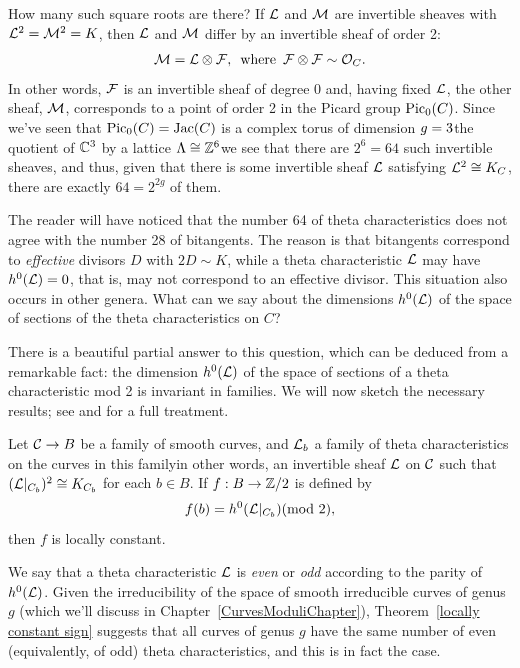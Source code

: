 How many such square roots are there? If ${\mathcal L}$ and ${\mathcal M}$ are invertible
sheaves with ${\mathcal L}^2 = {\mathcal M}^2 = K$, then ${\mathcal L}$ and ${\mathcal M}$ differ by an
invertible sheaf of order 2:
$$
{\mathcal M} = {\mathcal L} \otimes {\mathcal F}, \enspace \text{where} \enspace {\mathcal F} \otimes {\mathcal F} \sim
{\mathcal O}_C.
$$
In other words, ${\mathcal F}$ is an invertible sheaf of degree 0 and, having
fixed ${\mathcal L}$,  the other sheaf, ${\mathcal M}$, corresponds to a point of order
2 in the
Picard group
%
$\operatorname{Pic}_0(C)$. Since we've seen that $\operatorname{Pic}_0(C) =
\operatorname{Jac}(C)$ is a complex torus of dimension
$g =\nobreak 3$\emdash the quotient of ${\mathbb C}^3$
by a lattice $\Lambda \cong {\mathbb Z}^6$\emdash we see that there are $2^6 = 64$
such invertible sheaves, and thus, given that there is some invertible
sheaf ${\mathcal L}$ satisfying ${\mathcal L}^2 \cong K_C$, there are exactly $64 = 2^{2g}$
of them.

The reader will have noticed that the number 64 of theta characteristics
does not agree with the number 28 of bitangents. The reason is
that
bitangents correspond to \emph{effective} divisors $D$ with $2D
\sim K$, while a theta characteristic ${\mathcal L}$ may have $h^0({\mathcal L}) = 0$,
that is, may not correspond to an effective divisor.
This situation also occurs in other genera.
What can we say about the dimensions $h^0({\mathcal L})$ of the space of sections
of the theta characteristics on $C$?

 There is a beautiful partial answer to this question, which can be
 deduced from a remarkable fact: the dimension $h^0({\mathcal L})$ of the space
 of sections of a theta characteristic mod 2 is invariant in families.
We will now
sketch the necessary results; see \cite{MumfordPaper} and \cite{JHPaper}
for a full treatment.

 \begin{theorem}
 \label{locally constant sign}
 Let $\mathcal C \to B$ be a family of smooth curves, and ${\mathcal L}_b$ a family of
 theta characteristics on the curves in this family\emdash in other words, an
 invertible sheaf ${\mathcal L}$ on $\mathcal C$ such that $({\mathcal L}|_{C_b})^2 \cong K_{C_b}$
 for each $b \in B$.
If
$f : B \to {\mathbb Z}/2$
is defined by
 $$
 f(b) = h^0(\cL|_{C_b}) \;  \; (\mathrm{mod\ } 2),
 $$
then $f$ is locally constant.
\unif
\end{theorem}

We say that a theta characteristic ${\mathcal L}$ is \emph{even} or \emph{odd}
%
according to the parity of $h^0({\mathcal L})$. Given the irreducibility of the
space of smooth irreducible curves of genus $g$ (which we'll discuss
in Chapter~\ref{CurvesModuliChapter}),
Theorem~\ref{locally constant sign}
suggests that all curves of genus $g$ have the same number of
even (equivalently, of odd) theta characteristics, and this is in fact
the case.

